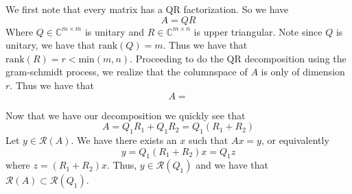\documentclass{exam}
\begin{document}
  \begin{solution}
    We first note that every matrix has a QR factorization. So we have
    \[
        A = QR
    \]
    Where $Q \in \mathds{C}^{m \times m}$ is unitary and $R \in \mathds{C}^{m \times n}$ is upper triangular. Note since $Q$ is unitary, we have that $\text{rank}(Q) = m$. Thus we have that $\text{rank}(R) = r < \text{min}(m,n)$. Proceeding to do the QR decomposition using the gram-schmidt process, we realize that the columnspace of $A$ is only of dimension $r$. Thus we have that
    \[
        A = 
    \]

    Now that we have our decomposition we quickly see that
    \[
        A = Q_1R_1 + Q_1R_2 = Q_1(R_1 + R_2)
    \]
    Let $y \in \mathcal{R}(A)$. We have there exists an $x$ such that $Ax = y$, or equivalently
    \[
        y = Q_1(R_1 + R_2)x = Q_1z
    \]
where $z = (R_1 + R_2)x$. Thus, $y \in \mathcal{R}(Q_1)$ and we have that $\mathcal{R}(A) \subset \mathcal{R}(Q_1)$. 
  \end{solution}
\end{document}
